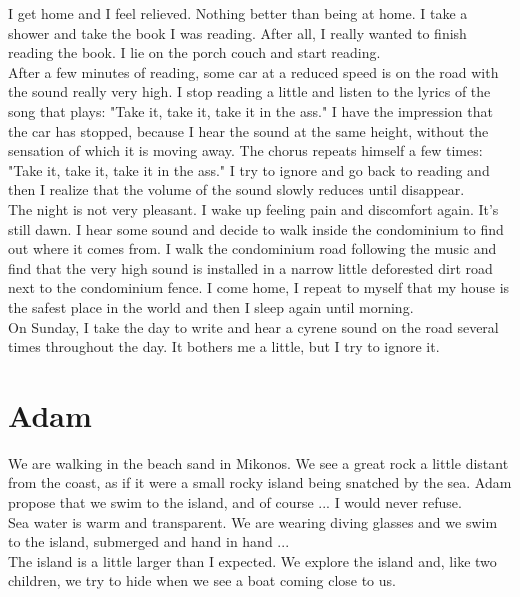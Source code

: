 \documentclass[11pt]{book}
\begin{document}
\noindent I get home and I feel relieved. Nothing better than being at home. I take a shower and take the book I was reading. After all, I really wanted to finish reading the book. I lie on the porch couch and start reading. \\

\noindent After a few minutes of reading, some car at a reduced speed is on the road with the sound really very high. I stop reading a little and listen to the lyrics of the song that plays: "Take it, take it, take it in the ass." I have the impression that the car has stopped, because I hear the sound at the same height, without the sensation of which it is moving away. The chorus repeats himself a few times: "Take it, take it, take it in the ass." I try to ignore and go back to reading and then I realize that the volume of the sound slowly reduces until disappear. \\

\noindent The night is not very pleasant. I wake up feeling pain and discomfort again. It's still dawn. I hear some sound and decide to walk inside the condominium to find out where it comes from. I walk the condominium road following the music and find that the very high sound is installed in a narrow little deforested dirt road next to the condominium fence. I come home, I repeat to myself that my house is the safest place in the world and then I sleep again until morning. \\

\noindent On Sunday, I take the day to write and hear a cyrene sound on the road several times throughout the day. It bothers me a little, but I try to ignore it.

\chapter{Adam}

\noindent We are walking in the beach sand in Mikonos. We see a great rock a little distant from the coast, as if it were a small rocky island being snatched by the sea. Adam propose that we swim to the island, and of course ... I would never refuse. \\

\noindent Sea water is warm and transparent. We are wearing diving glasses and we swim to the island, submerged and hand in hand ... \\

\noindent The island is a little larger than I expected. We explore the island and, like two children, we try to hide when we see a boat coming close to us. \\
\end{document}
